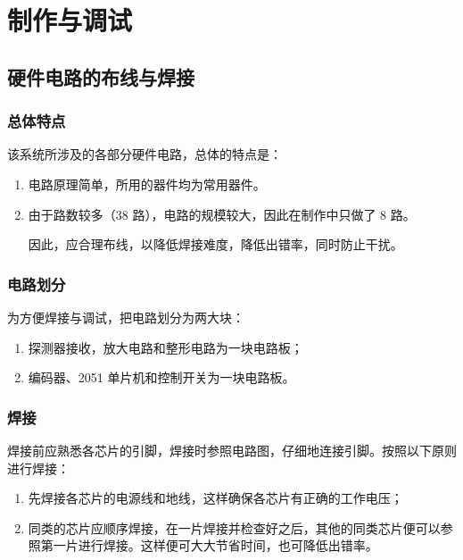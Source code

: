 \chapter{制作与调试}

\section{硬件电路的布线与焊接}

\subsection{总体特点}

该系统所涉及的各部分硬件电路，总体的特点是：

\begin{enumerate}
  \item 电路原理简单，所用的器件均为常用器件。
  \item 由于路数较多（38 路），电路的规模较大，因此在制作中只做了 8 路。
  
  因此，应合理布线，以降低焊接难度，降低出错率，同时防止干扰。
\end{enumerate}

\subsection{电路划分}

为方便焊接与调试，把电路划分为两大块：

\begin{enumerate}
  \item 探测器接收，放大电路和整形电路为一块电路板；
  \item 编码器、2051 单片机和控制开关为一块电路板。
\end{enumerate}

\subsection{焊接}

焊接前应熟悉各芯片的引脚，焊接时参照电路图，仔细地连接引脚。按照以下原则进行焊接：

\begin{enumerate}
  \item 先焊接各芯片的电源线和地线，这样确保各芯片有正确的工作电压；
  \item 同类的芯片应顺序焊接，在一片焊接并检查好之后，其他的同类芯片便可以参照第一片进行焊接。这样便可大大节省时间，也可降低出错率。
\end{enumerate}

